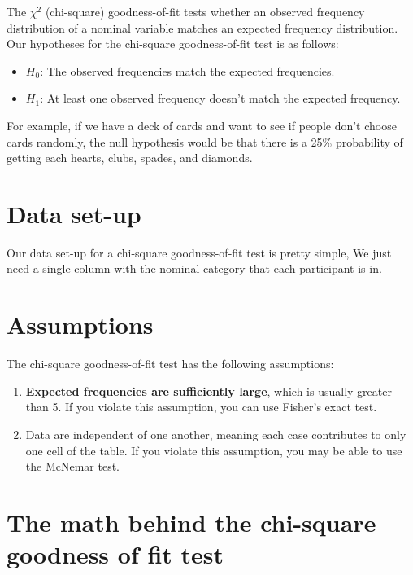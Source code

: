 \documentclass[
]{book}
\begin{document}
The \(\chi^2\) (chi-square) goodness-of-fit tests whether an observed frequency distribution of a nominal variable matches an expected frequency distribution. Our hypotheses for the chi-square goodness-of-fit test is as follows:

\begin{itemize}
\item
  \(H_0\): The observed frequencies match the expected frequencies.
\item
  \(H_1\): At least one observed frequency doesn't match the expected frequency.
\end{itemize}

For example, if we have a deck of cards and want to see if people don't choose cards randomly, the null hypothesis would be that there is a 25\% probability of getting each hearts, clubs, spades, and diamonds.

\hypertarget{data-set-up-5}{%
\section{Data set-up}\label{data-set-up-5}}

Our data set-up for a chi-square goodness-of-fit test is pretty simple, We just need a single column with the nominal category that each participant is in.

\hypertarget{assumptions-5}{%
\section{Assumptions}\label{assumptions-5}}

The chi-square goodness-of-fit test has the following assumptions:

\begin{enumerate}
\def\labelenumi{\arabic{enumi}.}
\item
  \textbf{Expected frequencies are sufficiently large}, which is usually greater than 5. If you violate this assumption, you can use Fisher's exact test.
\item
  Data are independent of one another, meaning each case contributes to only one cell of the table. If you violate this assumption, you may be able to use the McNemar test.
\end{enumerate}

\hypertarget{the-math-behind-the-chi-square-goodness-of-fit-test}{%
\section{The math behind the chi-square goodness of fit test}\label{the-math-behind-the-chi-square-goodness-of-fit-test}}
\end{document}

